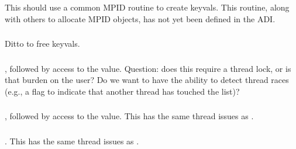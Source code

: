 \documentclass{article}
\begin{document}
\subsubsection{}
This should use a common MPID routine to create keyvals.  This routine, along
with others to allocate MPID objects, has not yet been defined in the ADI.

\subsubsection{}
Ditto to free keyvals.



\subsubsection{}
\begin{adi3}, followed by access to the value.
Question: does this require a thread lock, or is that burden on the user?  Do
we want to have the ability to detect thread races (e.g., a flag to indicate
that another thread has touched the list)?
\end{adi3}

\subsubsection{}
\begin{adi3}, followed by access to the value.
This has the same thread issues as .
\end{adi3}

\subsubsection{}
\begin{adi3}.
This has the same thread issues as .
\end{adi3}
\end{document}
